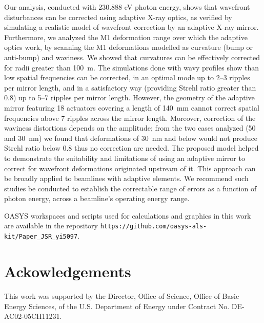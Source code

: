 \documentclass{iucr}
\newcommand{\inblue}[1]{{\color{blue}#1}}
\begin{document}
Our analysis, conducted with 230.888 eV photon energy, shows that wavefront disturbances can be corrected using adaptive X-ray optics, as verified by simulating a realistic model of wavefront correction by an adaptive X-ray mirror. Furthermore, we analyzed the M1 deformation range over which the adaptive optics work, by scanning the M1 deformations modelled as curvature (bump or anti-bump) and waviness. We showed that curvatures can be effectively corrected for radii greater than 100~m. The simulations done with wavy profiles show than low spatial frequencies can be corrected, in an optimal mode up to 2--3 ripples per mirror length, and in a satisfactory way (providing Strehl ratio greater than 0.8) up to 5--7 ripples per mirror length. However, the geometry of the adaptive mirror featuring 18 actuators covering a length of 140~mm cannot correct spatial frequencies above 7 ripples across the mirror length. Moreover, correction of the waviness distortions depends on the amplitude; from the two cases analyzed (50 and 30~nm) we found that deformations of 30~nm and below would not produce Strehl ratio below 0.8 thus no correction are needed. The proposed model helped to demonstrate the suitability and limitations of using an adaptive mirror to correct for wavefront deformations originated upstream of it. This approach can be broadly applied to beamlines with adaptive elements. We recommend such studies be conducted to establish the correctable range of errors as a function of photon energy, across a beamline's operating energy range.

\inblue{OASYS workspaces and scripts used for calculations and graphics in this work are available in the repository {\tt https://github.com/oasys-als-kit/Paper\_JSR\_yi5097}.}

\section{Ackowledgements}       
 
 
This work was supported by the Director, Office of Science, Office of Basic Energy Sciences, of the U.S. Department of Energy under Contract No. DE-AC02-05CH11231.
 
\end{document}
